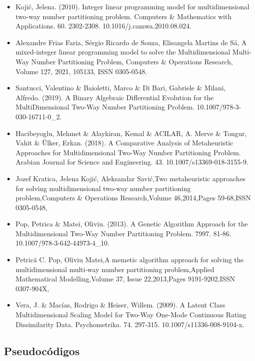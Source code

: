 \documentclass[13pt,a4paper]{article}
\begin{document}
\begin{itemize}
    \item Kojić, Jelena. (2010). Integer linear programming model for multidimensional two-way number partitioning problem. Computers \& Mathematics with Applications. 60. 2302-2308. 10.1016/j.camwa.2010.08.024. 
    \item Alexandre Frias Faria, Sérgio Ricardo de Souza, Elisangela Martins de Sá, A mixed-integer linear programming model to solve the Multidimensional Multi-Way Number Partitioning Problem, Computers \& Operations Research, Volume 127, 2021, 105133, ISSN 0305-0548.
    \item Santucci, Valentino \& Baioletti, Marco \& Di Bari, Gabriele \& Milani, Alfredo. (2019). A Binary Algebraic Differential Evolution for the MultiDimensional Two-Way Number Partitioning Problem. 10.1007/978-3-030-16711-0\_2. 
    \item Hacibeyoglu, Mehmet \& Alaykiran, Kemal \& ACILAR, A. Merve \& Tongur, Vahit \& Ülker, Erkan. (2018). A Comparative Analysis of Metaheuristic Approaches for Multidimensional Two-Way Number Partitioning Problem. Arabian Journal for Science and Engineering. 43. 10.1007/s13369-018-3155-9. 
    \item Jozef Kratica, Jelena Kojić, Aleksandar Savić,Two metaheuristic approaches for solving multidimensional two-way number partitioning problem,Computers \& Operations Research,Volume 46,2014,Pages 59-68,ISSN 0305-0548,
    \item Pop, Petrica \& Matei, Oliviu. (2013). A Genetic Algorithm Approach for the Multidimensional Two-Way Number Partitioning Problem. 7997. 81-86. 10.1007/978-3-642-44973-4\_10. 
    \item Petrică C. Pop, Oliviu Matei,A memetic algorithm approach for solving the multidimensional multi-way number partitioning problem,Applied Mathematical Modelling,Volume 37, Issue 22,2013,Pages 9191-9202,ISSN 0307-904X,
    \item Vera, J. \& Macías, Rodrigo \& Heiser, Willem. (2009). A Latent Class Multidimensional Scaling Model for Two-Way One-Mode Continuous Rating Dissimilarity Data. Psychometrika. 74. 297-315. 10.1007/s11336-008-9104-x.
\end{itemize}

\newpage

\subsection{Pseudocódigos}
\end{document}
